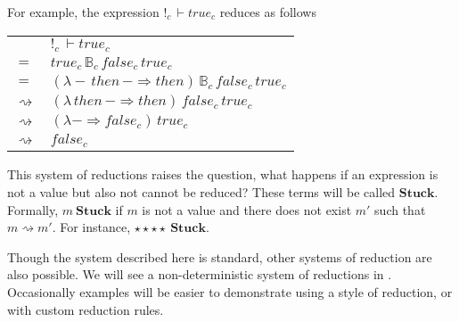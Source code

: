 For example, the expression $!_{c}\,\vdash true_{c}$ reduces as follows
\begin{tabular}{ll}
 & $!_{c}\,\vdash true_{c}$ \tabularnewline
 $=$ & $ true_{c}\,\mathbb{B}_{c}\,false_{c}\,true_{c}$ \tabularnewline
 $=$ & $ \left(\lambda-\,then\,-\Rightarrow then\right)\,\mathbb{B}_{c}\,false_{c}\,true_{c}$ \tabularnewline
 $\rightsquigarrow$ & $ \left(\lambda\,then\,-\Rightarrow then\right)\,false_{c}\,true_{c}$ \tabularnewline
 $\rightsquigarrow$ & $ \left(\lambda-\Rightarrow false_{c}\right)\,true_{c}$ \tabularnewline
 $\rightsquigarrow$ & $ false_{c}$ \tabularnewline
\end{tabular}
 
This system of reductions raises the question, what happens if an expression is not a value but also not cannot be reduced?
These terms will be called $\textbf{Stuck}$.
Formally, $m\ \textbf{Stuck}$ if $m$ is not a value and there does not exist $m'$ such that $m \rightsquigarrow m'$. 
For instance, $\star\star\star\star\ \textbf{Stuck}$.

Though the \cbv{} system described here is standard, other systems of reduction are also possible.
We will see a non-deterministic system of reductions in .
Occasionally examples will be easier to demonstrate using a \whnf{} style of reduction, or with custom reduction rules.

